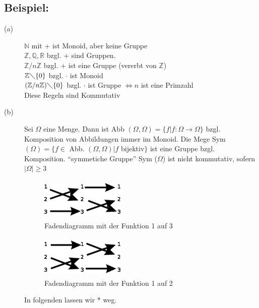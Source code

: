 \subsection{Beispiel:}
\begin{description}
	\item[(a)] $\mathbb{N}$ mit + ist Monoid, aber keine Gruppe\\
			$\mathbb{Z}, \mathbb{Q},  \mathbb{R}$ bzgl. + sind Gruppen.\\
			$\mathbb{Z}/n\mathbb{Z}$ bzgl. + ist eine Gruppe (vererbt von $\mathbb{Z}$)\\
			$\mathbb{Z} \diagdown \{0\}$ bzgl. $\cdot$ ist Monoid\\
			$(\mathbb{Z}/n\mathbb{Z}) \diagdown \{0\}$ bzgl. $\cdot$ ist Gruppe $\Leftrightarrow n$ ist eine Primzahl\\
			Diese Regeln sind Kommutativ
	\item[(b)] Sei $\Omega$ eine Menge. Dann ist Abb $(\Omega, \Omega) = \{f|f:\Omega \rightarrow \Omega\}$ bzgl. 
			Komposition von Abbildungen immer im Monoid. Die Mege Sym$(\Omega) = \{f \in$ Abb. $(\Omega, \Omega)|
			f$ bijektiv$\}$ ist eine Gruppe bzgl. Komposition. "`symmetiche Gruppe"' Sym ($\Omega$) ist nicht 
			kommutativ, sofern $|\Omega| \geq 3$
	\begin{figure} [H]
		\centering
		\includegraphics[width=4cm, height=2cm]{mainmatter/chapter3/pics/fadendia1-3.png}
		\caption{Fadendiagramm mit der Funktion 1 auf 3} 
	\end{figure}
	\begin{figure} [H]		
		\centering
		\includegraphics[width=4cm, height=2cm]{mainmatter/chapter3/pics/fadendia1-2.png}
		\caption{Fadendiagramm mit der Funktion 1 auf 2} 
	\end{figure}			
			In folgenden lassen wir $*$ weg.
\end{description}
%
%
%
